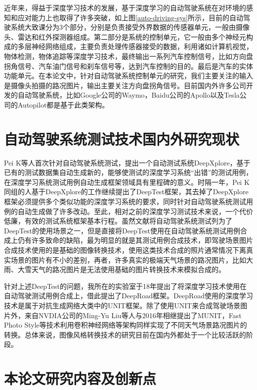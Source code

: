 近年来，得益于深度学习技术的发展，基于深度学习的自动驾驶系统在对环境的感知和应对能力上也取得了许多突破，如上图\ref{auto-driving-sys}所示，目前的自动驾驶系统大致课分为3个部分，分别是负责接受外界数据的传感器单元，一般由摄像头、雷达和红外探测器组成。第二部分是系统的控制单元，它一般由多个神经元构成的多层神经网络组成，主要负责处理传感器接受的数据，利用诸如计算机视觉，物体检测，物体追踪等深度学习技术，最终输出一系列汽车控制信号，比如方向盘拐角信号、汽车油门信号和刹车信号等，达到汽车控制的目的。最后是汽车的实体功能单元。在本论文中，针对自动驾驶系统控制单元的研究，我们主要关注的输入是摄像头拍摄的路况图片，输出主要关注方向盘拐角信号。目前国内外许多公司开发的自动驾驶系统，比如Google公司的Waymo，Baidu公司的Apollo以及Tesla公司的Autopilot都是基于此类架构。

\section{自动驾驶系统测试技术国内外研究现状}

Pei K\cite{DeepXplore}等人首次针对自动驾驶系统测试，提出一个自动测试系统DeepXplore，基于已有的测试数据集自动生成新的，能够使测试的深度学习系统“出错”的测试用例，在深度学习系统测试用例自动生成框架领域具有里程碑的意义。时隔一年，Pei K同组的人基于DeepXplore的工作继续提出了DeepTest\cite{DeepTest}框架，其去掉了DeepXplore框架必须提供多个类似功能的深度学习系统的要求，同时针对自动驾驶系统测试用例的自动生成做了许多改动。至此，相对之前的深度学习测试技术来说，一个代价低廉，有效的测试系统框架基本行程。虽然文献\cite{DeepTest}将自动驾驶系统测试列为了DeepTest的使用场景之一，但是直接将DeepTest使用在自动驾驶系统测试用例合成上仍有许多致命的缺陷，最为明显的就是其测试用例合成技术，即驾驶场景图片合成技术使用的是基础的图像转换技术，使用这类技术合成的照片通常情况下离真实场景的图片有不小的差别，再者，许多真实的极端天气场景的路况图片，比如大雨、大雪天气的路况图片是无法使用基础的图片转换技术来模拟合成的。

针对上述DeepTest的问题，我所在的实验室于18年提出了将深度学习技术使用在自动驾驶测试用例合成上，借此提出了DeepRoad框架\cite{DeepRoad}。DeepRoad使用的深度学习技术是属于对抗生成网络大类中的UNIT\cite{UNIT}框架。除了使用UNIT来合成驾驶场景图片外，来自NVDIA公司的Ming-Yu Liu等人与2016年相继提出了MUNIT\cite{MUNIT}，Fast Photo Style\cite{fps}等技术利用卷积神经网络等架构同样实现了不同天气场景路况图片的转换。总体来说，图像风格转换技术的研究目前在国内外都处于一个比较活跃的阶段。


\section{本论文研究内容及创新点}


